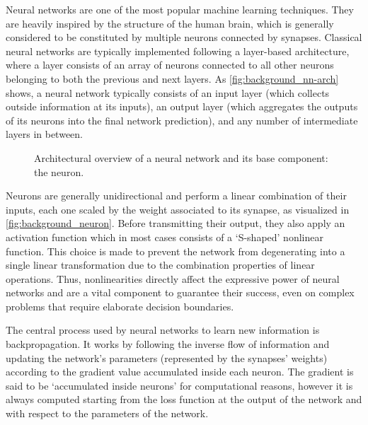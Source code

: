 Neural networks are one of the most popular machine learning techniques.
They are heavily inspired by the structure of the human brain, which is generally considered to be constituted by multiple neurons connected by synapses.
Classical neural networks are typically implemented following a layer-based architecture, where a layer consists of an array of neurons connected to all other neurons belonging to both the previous and next layers.
As \cref{fig:background_nn-arch} shows, a neural network typically consists of an input layer (which collects outside information at its inputs), an output layer (which aggregates the outputs of its neurons into the final network prediction), and any number of intermediate layers in between.

\begin{figure}[t!]
    \centering
    \quad
    \caption{Architectural overview of a neural network and its base component: the neuron.}
    \label{fig:background_nn-arch_neuron}
\end{figure}

Neurons are generally unidirectional and perform a linear combination of their inputs, each one scaled by the weight associated to its synapse, as visualized in \cref{fig:background_neuron}.
Before transmitting their output, they also apply an activation function which in most cases consists of a `S-shaped' nonlinear function.
This choice is made to prevent the network from degenerating into a single linear transformation due to the combination properties of linear operations.
Thus, nonlinearities directly affect the expressive power of neural networks and are a vital component to guarantee their success, even on complex problems that require elaborate decision boundaries.

The central process used by neural networks to learn new information is backpropagation.
It works by following the inverse flow of information and updating the network's parameters (represented by the synapses' weights) according to the gradient value accumulated inside each neuron.
The gradient is said to be `accumulated inside neurons' for computational reasons, however it is always computed starting from the loss function at the output of the network and with respect to the parameters of the network.

